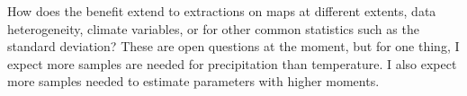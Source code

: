 \documentclass{article}\usepackage[]{graphicx}\usepackage[]{color}
\makeatletter
\newenvironment{kframe}{%
 \def\at@end@of@kframe{}%
 \ifinner\ifhmode%
  \def\at@end@of@kframe{\end{minipage}}%
  \begin{minipage}{\columnwidth}%
 \fi\fi%
 \def\FrameCommand##1{\hskip\@totalleftmargin \hskip-\fboxsep
 \colorbox{shadecolor}{##1}\hskip-\fboxsep
     \hskip-\linewidth \hskip-\@totalleftmargin \hskip\columnwidth}%
 \MakeFramed {\advance\hsize-\width
   \@totalleftmargin\z@ \linewidth\hsize
   \@setminipage}}%
 {\par\unskip\endMakeFramed%
 \at@end@of@kframe}
\newenvironment{knitrout}{}{} %
\makeatother
\begin{document}
\begin{knitrout}
\color{fgcolor}\begin{kframe}


{\ttfamily\noindent\bfseries\color{errorcolor}{\#\# Error in eval(expr, envir, enclos): object 'no.knit' not found}}

{\ttfamily\noindent\bfseries\color{errorcolor}{\#\# Error in data.frame(x = names(med)[-4], y = med[-4]): object 'med' not found}}

{\ttfamily\noindent\bfseries\color{errorcolor}{\#\# Error in eval(expr, envir, enclos): object 'no.knit' not found}}\end{kframe}
\end{knitrout}

How does the benefit extend to extractions on maps at different extents, data heterogeneity, climate variables,
or for other common statistics such as the standard deviation?
These are open questions at the moment, but for one thing,
I expect more samples are needed for precipitation than temperature.
I also expect more samples needed to estimate parameters with higher moments.
\end{document}

